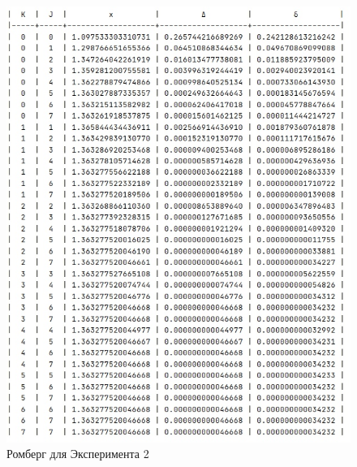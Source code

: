 \documentclass[14pt, titlepage, a4paper]{extarticle} %
\begin{document}
	\begin{figure}[h]\label{fig:rm2}
		\centering
		\includegraphics[width=500pt]{r2.jpeg}
		\caption{Ромберг для Эксперимента 2}
	\end{figure}
\end{document}
